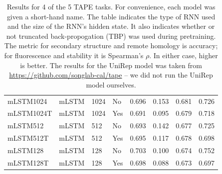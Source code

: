\documentclass[a4paper,12pt]{article}
\begin{document}
\begin{table}[H]
\begin{tabularx}{\linewidth}{Llllllll}
mLSTM1024     & mLSTM        & 1024          & No            & 0.696              & 0.153                & 0.681           & 0.726          \\
mLSTM1024T    & mLSTM        & 1024          & Yes           & 0.691              & 0.095                & 0.679           & 0.718          \\
mLSTM512      & mLSTM        & 512           & No            & 0.693              & 0.142                & 0.677           & 0.725          \\
mLSTM512T     & mLSTM        & 512           & Yes           & 0.695              & 0.117                & 0.678           & 0.698          \\
mLSTM128      & mLSTM        & 128           & No            & 0.703              & 0.100                & 0.674           & 0.752          \\
mLSTM128T     & mLSTM        & 128           & Yes           & 0.698              & 0.088                & 0.673           & 0.697          \\ \bottomrule
\end{tabularx}
\caption{Results for 4 of the 5 TAPE tasks. For convenience, each model was given a short-hand name. The table indicates the type of RNN used and the size of the RNN's hidden state. It also indicates whether or not truncated back-propogation (TBP) was used during pretraining. The metric for secondary structure and remote homology is accuracy; for fluorescence and stability it is Spearman's $\rho$. In either case, higher is better. The results for the UniRep model was taken from \url{https://github.com/songlab-cal/tape} -- we did not run the UniRep model ourselves.}
\label{table:taperesults}
\end{table}
\end{document}

